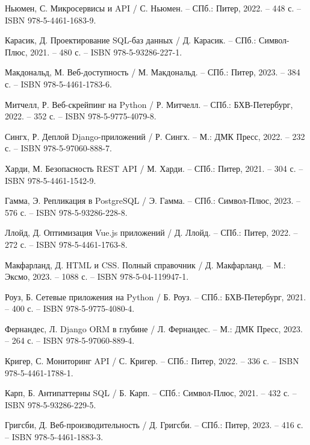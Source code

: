 \begin{thebibliography}{9}
	 Ньюмен, С. Микросервисы и API / С. Ньюмен. – СПб.: Питер, 2022. – 448 с. – ISBN 978-5-4461-1683-9.
	
	 Карасик, Д. Проектирование SQL-баз данных / Д. Карасик. – СПб.: Символ-Плюс, 2021. – 480 с. – ISBN 978-5-93286-227-1.
	
	 Макдональд, М. Веб-доступность / М. Макдональд. – СПб.: Питер, 2023. – 384 с. – ISBN 978-5-4461-1783-6.
	
	 Митчелл, Р. Веб-скрейпинг на Python / Р. Митчелл. – СПб.: БХВ-Петербург, 2022. – 352 с. – ISBN 978-5-9775-4079-8.
	
	 Сингх, Р. Деплой Django-приложений / Р. Сингх. – М.: ДМК Пресс, 2022. – 232 с. – ISBN 978-5-97060-888-7.
	
	 Харди, М. Безопасность REST API / М. Харди. – СПб.: Питер, 2021. – 304 с. – ISBN 978-5-4461-1542-9.
	
	 Гамма, Э. Репликация в PostgreSQL / Э. Гамма. – СПб.: Символ-Плюс, 2023. – 576 с. – ISBN 978-5-93286-228-8.
	
	 Ллойд, Д. Оптимизация Vue.js приложений / Д. Ллойд. – СПб.: Питер, 2022. – 272 с. – ISBN 978-5-4461-1763-8.
	
	 Макфарланд, Д. HTML и CSS. Полный справочник / Д. Макфарланд. – М.: Эксмо, 2023. – 1088 с. – ISBN 978-5-04-119947-1.
	
	 Роуз, Б. Сетевые приложения на Python / Б. Роуз. – СПб.: БХВ-Петербург, 2021. – 400 с. – ISBN 978-5-9775-4080-4.
	
	 Фернандес, Л. Django ORM в глубине / Л. Фернандес. – М.: ДМК Пресс, 2023. – 264 с. – ISBN 978-5-97060-889-4.
	
	 Кригер, С. Мониторинг API / С. Кригер. – СПб.: Питер, 2022. – 336 с. – ISBN 978-5-4461-1788-1.
	
	 Карп, Б. Антипаттерны SQL / Б. Карп. – СПб.: Символ-Плюс, 2021. – 432 с. – ISBN 978-5-93286-229-5.
	
	 Григсби, Д. Веб-производительность / Д. Григсби. – СПб.: Питер, 2023. – 416 с. – ISBN 978-5-4461-1883-3.
\end{thebibliography}
